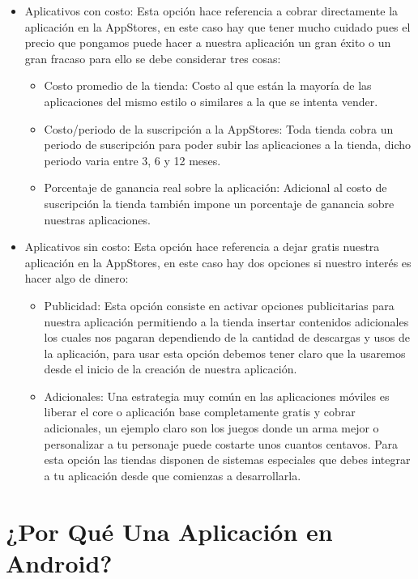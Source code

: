 \documentclass[11pt]{book}
\begin{document}
\begin{itemize}

\item Aplicativos con costo: Esta opción hace referencia a cobrar directamente la aplicación en la \gls{AppStores}, en este caso hay que tener mucho cuidado pues el precio que pongamos puede hacer a nuestra aplicación un gran éxito o un gran fracaso para ello se debe considerar tres cosas:
	\begin{itemize}
	\item Costo promedio de la tienda: Costo al que están la mayoría de las aplicaciones del mismo estilo o similares a la que se intenta vender.
	\item Costo/periodo de la suscripción a la \gls{AppStores}: Toda tienda cobra un periodo de suscripción para poder subir las aplicaciones a la tienda, dicho periodo varia entre 3, 6 y 12 meses.
	\item Porcentaje de ganancia real sobre la aplicación: Adicional al costo de suscripción la tienda también impone un porcentaje de ganancia sobre nuestras aplicaciones.
	\end{itemize}
\item Aplicativos sin costo: Esta opción hace referencia a dejar gratis nuestra aplicación en la \gls{AppStores}, en este caso hay dos opciones si nuestro interés es hacer algo de dinero:
	\begin{itemize}
	\item Publicidad: Esta opción consiste en activar opciones publicitarias para nuestra aplicación permitiendo a la tienda insertar contenidos adicionales los cuales nos pagaran dependiendo de la cantidad de descargas y usos de la aplicación, para usar esta opción debemos tener claro que la usaremos desde el inicio de la creación de nuestra aplicación.
	\item Adicionales: Una estrategia muy común en las aplicaciones móviles es liberar el core o aplicación base completamente gratis y cobrar adicionales, un ejemplo claro son los juegos donde un arma mejor o personalizar a tu personaje puede costarte unos cuantos centavos. Para esta opción las tiendas disponen de sistemas especiales que debes integrar a tu aplicación desde que comienzas a desarrollarla.
	\end{itemize}

\end{itemize}

\chapter{¿Por Qué Una Aplicación en Android?}  
\newpage
\end{document}
